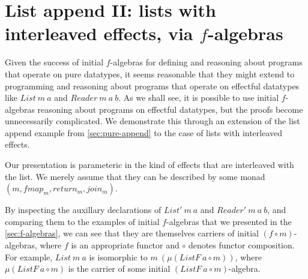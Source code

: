 \documentclass{jfp1}
\begin{document}


\section{List append II: lists with interleaved effects, via $f$-algebras}
\label{sec:direct-eappend}

Given the success of initial $f$-algebras for defining and reasoning
about programs that operate on pure datatypes, it seems reasonable
that they might extend to programming and reasoning about programs
that operate on effectful datatypes like $\mathit{List}~m~a$ and
$\mathit{Reader}~m~a~b$. As we shall see, it is possible to use
initial $f$-algebras reasoning about programs on effectful datatypes,
but the proofs become unnecessarily complicated. We demonstrate this
through an extension of the list append example from
\autoref{sec:pure-append} to the case of lists with interleaved
effects.

Our presentation is parameteric in the kind of effects that
are interleaved with the list. We merely assume that they can be
described by some monad $(m, \mathit{fmap_m}, \mathit{return_m},
\mathit{join_m})$.

By inspecting the auxillary declarations of $\mathit{List'}~m~a$ and
$\mathit{Reader'}~m~a~b$, and comparing them to the examples of
initial $f$-algebras that we presented in the
\autoref{sec:f-algebras}, we can see that they are themselves carriers
of initial $(f \circ m)$-algebras, where $f$ is an appropriate functor
and $\circ$ denotes functor composition. For example,
$\mathit{List}~m~a$ is isomorphic to $m~(\mu (\mathit{ListF}~a \circ
m))$, where $\mu (\mathit{ListF}~a \circ m)$ is the carrier of some
initial $(\mathit{ListF}~a \circ m)$-algebra.
\end{document}
